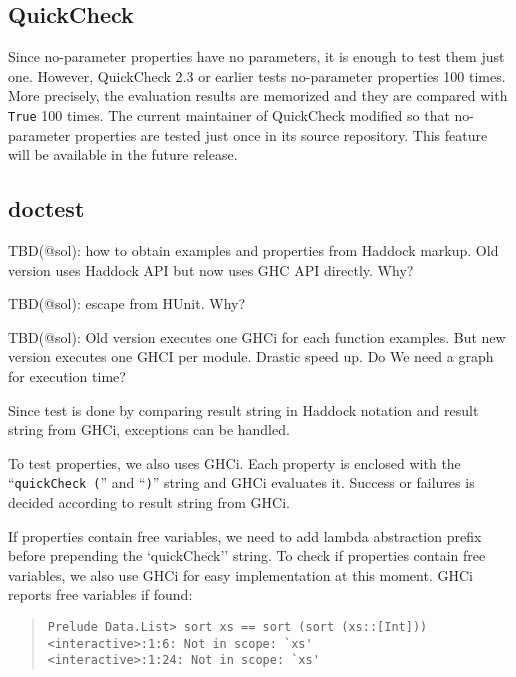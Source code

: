\documentclass[preprint]{sigplanconf}
\begin{document}
\subsection{QuickCheck}

Since no-parameter properties have no parameters,
it is enough to test them just one.
However, QuickCheck 2.3 or earlier tests no-parameter properties 100 times.
More precisely, the evaluation results are memorized and they are
compared with {\tt True} 100 times.
The current maintainer of QuickCheck modified so that
no-parameter properties are tested just once in its source repository.
This feature will be available in the future release.

\subsection{doctest}
\label{sec:doctest}

TBD(@sol): how to obtain examples and properties from Haddock markup.
Old version uses Haddock API but now uses GHC API directly. Why?

TBD(@sol): escape from HUnit. Why?

TBD(@sol): Old version executes one GHCi for each function examples.
But new version executes one GHCI per module.
Drastic speed up. Do We need a graph for execution time?

Since test is done by comparing result string in Haddock notation
and result string from GHCi, exceptions can be handled.

To test properties, we also uses GHCi.
Each property is enclosed with
the ``\verb|quickCheck (|'' and ``\verb|)|'' string
and GHCi evaluates it.
Success or failures is decided according to result string from GHCi.

If properties contain free variables,
we need to add lambda abstraction prefix before prepending
the `quickCheck'' string.
To check if properties contain free variables,
we also use GHCi for easy implementation at this moment.
GHCi reports free variables if found:

\begin{quote}
\small
\begin{verbatim}
Prelude Data.List> sort xs == sort (sort (xs::[Int]))
<interactive>:1:6: Not in scope: `xs'
<interactive>:1:24: Not in scope: `xs'
\end{verbatim}
\end{quote}
\end{document}
